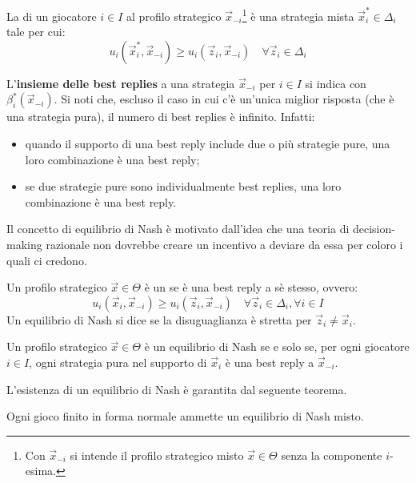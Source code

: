 \begin{mydef}
	La  di un giocatore $i \in I$ al profilo strategico $\vec{x}_{-i}$\footnote{Con $\vec{x}_{-i}$ si intende il profilo strategico misto $\vec{x} \in \Theta$ senza la componente $i$-esima.} è una strategia mista $\vec{x}_i^* \in \Delta_i$ tale per cui:
	\begin{displaymath}
		u_i(\vec{x}_i^*, \vec{x}_{-i}) \geq u_i(\vec{z}_i, \vec{x}_{-i}) \quad \forall \vec{z}_i \in \Delta_i
	\end{displaymath}
\end{mydef}
\noindent L'\textbf{insieme delle best replies} a una strategia $\vec{x}_{-i}$ per $i \in I$ si indica con $\beta_i^*(\vec{x}_{-i})$. Si noti che, escluso il caso in cui c'è un'unica miglior risposta (che è una strategia pura), il numero di best replies è infinito. Infatti:
\begin{itemize}
	\item quando il supporto di una best reply include due o più strategie pure, una loro combinazione è una best reply;
	\item se due strategie pure sono individualmente best replies, una loro combinazione è una best reply.
\end{itemize}
Il concetto di equilibrio di Nash è motivato dall'idea che una teoria di decision-making razionale non dovrebbe creare un incentivo a deviare da essa per coloro i quali ci credono.
\begin{mydef}
	Un profilo strategico $\vec{x} \in \Theta$ è un  se è una best reply a sè stesso, ovvero:
	\begin{displaymath}
		u_i(\vec{x}_i, \vec{x}_{-i}) \geq u_i(\vec{z}_i, \vec{x}_{-i}) \quad \forall \vec{z}_i \in \Delta_i, \forall i \in I
	\end{displaymath}
	Un equilibrio di Nash si dice  se la disuguaglianza è stretta per $\vec{z}_i \neq \vec{x}_i$.
\end{mydef}
\begin{thm}
	Un profilo strategico $\vec{x} \in \Theta$ è un equilibrio di Nash se e solo se, per ogni giocatore $i \in I$, ogni strategia pura nel supporto di $\vec{x}_i$ è una best reply a $\vec{x}_{-i}$.
\end{thm}
\noindent L'esistenza di un equilibrio di Nash è garantita dal seguente teorema.
\begin{thm}[J. Nash, 1951]
	Ogni gioco finito in forma normale ammette un equilibrio di Nash misto.
\end{thm}

